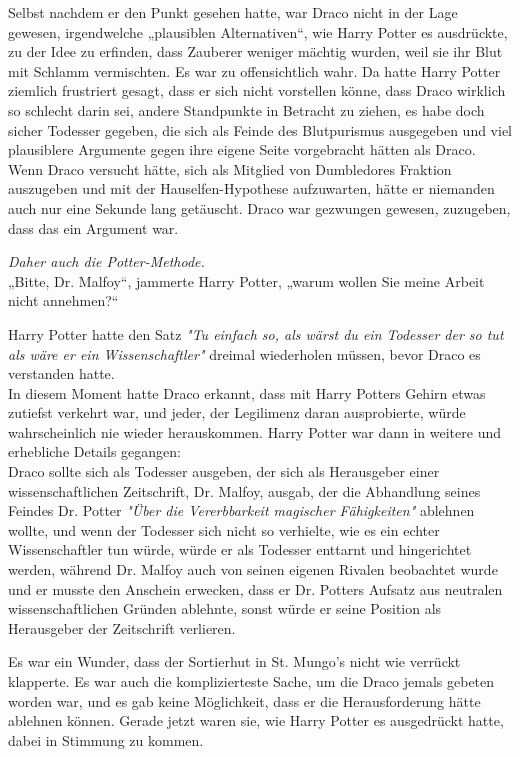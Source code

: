 {Selbst nachdem er den Punkt gesehen hatte, war Draco nicht in der Lage gewesen, irgendwelche „plausiblen Alternativen“, wie Harry Potter es ausdrückte, zu der Idee zu erfinden, dass Zauberer weniger mächtig wurden, weil sie ihr Blut mit Schlamm vermischten. Es war zu offensichtlich wahr. Da hatte Harry Potter ziemlich frustriert gesagt, dass er sich nicht vorstellen könne, dass Draco wirklich so schlecht darin sei, andere Standpunkte in Betracht zu ziehen, es habe doch sicher Todesser gegeben, die sich als Feinde des Blutpurismus ausgegeben und viel plausiblere Argumente gegen ihre eigene Seite vorgebracht hätten als Draco. Wenn Draco versucht hätte, sich als Mitglied von Dumbledores Fraktion auszugeben und mit der Hauselfen-Hypothese aufzuwarten, hätte er niemanden auch nur eine Sekunde lang getäuscht. Draco war gezwungen gewesen, zuzugeben, dass das ein Argument war.

\emph{Daher auch die Potter-Methode.}\\ „Bitte, Dr. Malfoy“, jammerte Harry Potter, „warum wollen Sie meine Arbeit nicht annehmen?“

Harry Potter hatte den Satz \emph{"Tu einfach so, als wärst du ein Todesser der so tut als wäre er ein Wissenschaftler"} dreimal wiederholen müssen, bevor Draco es verstanden hatte.\\ In diesem Moment hatte Draco erkannt, dass mit Harry Potters Gehirn etwas zutiefst verkehrt war, und jeder, der Legilimenz daran ausprobierte, würde wahrscheinlich nie wieder herauskommen. Harry Potter war dann in weitere und erhebliche Details gegangen:\\ Draco sollte sich als Todesser ausgeben, der sich als Herausgeber einer wissenschaftlichen Zeitschrift, Dr. Malfoy, ausgab, der die Abhandlung seines Feindes Dr. Potter \emph{"Über die Vererbbarkeit magischer Fähigkeiten"} ablehnen wollte, und wenn der Todesser sich nicht so verhielte, wie es ein echter Wissenschaftler tun würde, würde er als Todesser enttarnt und hingerichtet werden, während Dr. Malfoy auch von seinen eigenen Rivalen beobachtet wurde und er musste den Anschein erwecken, dass er Dr. Potters Aufsatz aus neutralen wissenschaftlichen Gründen ablehnte, sonst würde er seine Position als Herausgeber der Zeitschrift verlieren.

Es war ein Wunder, dass der Sortierhut in St. Mungo's nicht wie verrückt klapperte. Es war auch die komplizierteste Sache, um die Draco jemals gebeten worden war, und es gab keine Möglichkeit, dass er die Herausforderung hätte ablehnen können. Gerade jetzt waren sie, wie Harry Potter es ausgedrückt hatte, dabei in Stimmung zu kommen.

}
